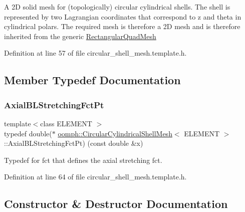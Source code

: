 A 2D solid mesh for (topologically) circular cylindrical shells. The shell is represented by two Lagrangian coordinates that correspond to z and theta in cylindrical polars. The required mesh is therefore a 2D mesh and is therefore inherited from the generic \hyperlink{classoomph_1_1RectangularQuadMesh}{Rectangular\+Quad\+Mesh} 

Definition at line 57 of file circular\+\_\+shell\+\_\+mesh.\+template.\+h.



\subsection{Member Typedef Documentation}
\mbox{\label{classoomph_1_1CircularCylindricalShellMesh_a770336fa72e8911f31b9fe3f70197a51}} 
\subsubsection{\texorpdfstring{Axial\+B\+L\+Stretching\+Fct\+Pt}{AxialBLStretchingFctPt}}
{\footnotesize\ttfamily template$<$class E\+L\+E\+M\+E\+NT $>$ \\
typedef double($\ast$ \hyperlink{classoomph_1_1CircularCylindricalShellMesh}{oomph\+::\+Circular\+Cylindrical\+Shell\+Mesh}$<$ E\+L\+E\+M\+E\+NT $>$\+::Axial\+B\+L\+Stretching\+Fct\+Pt) (const double \&x)}



Typedef for fct that defines the axial stretching fct. 



Definition at line 64 of file circular\+\_\+shell\+\_\+mesh.\+template.\+h.



\subsection{Constructor \& Destructor Documentation}
\mbox{\label{classoomph_1_1CircularCylindricalShellMesh_ad392c085b9a8f87fd9a24e02738f5d60}} 
